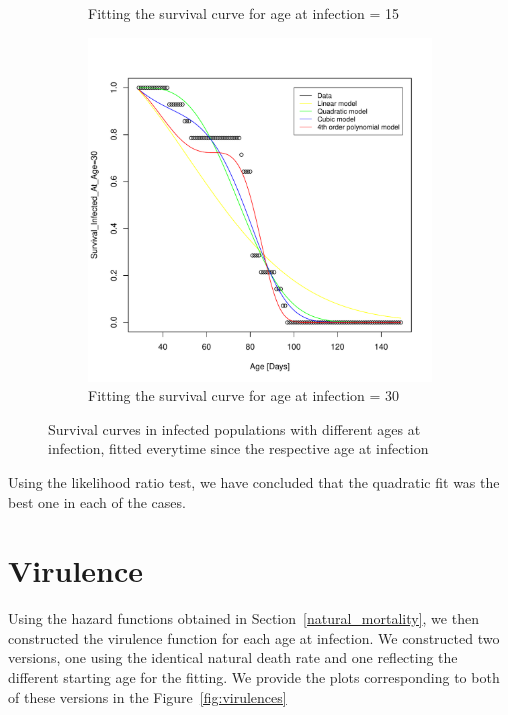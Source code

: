 \documentclass[10pt]{article}         %
\begin{document}
{\begin{figure}[H]
\begin{subfigure}[b]{0.5\textwidth}
    \caption{Fitting the survival curve for age at infection = 15}
    \label{fig:subfigure_2}
  \end{subfigure}
  \begin{subfigure}[b]{0.5\textwidth}
    \includegraphics[width=\textwidth]{Fitting_delta_inf_at_age_30.pdf}
    \caption{Fitting the survival curve for age at infection = 30}
    \label{fig:subfigure_3}
  \end{subfigure}
  \caption{Survival curves in infected populations with different ages at infection, fitted everytime since the respective age at infection}
  \label{fig:survival_infected}
\end{figure}}

Using the likelihood ratio test, we have concluded that the quadratic fit was the best one in each of the cases.

\section{Virulence}

Using the hazard functions obtained in Section~\ref{natural_mortality}, we then constructed the virulence function for each age at infection. We constructed two versions, one using the identical natural death rate and one reflecting the different starting age for the fitting. We provide the plots corresponding to both of these versions in the Figure~\ref{fig:virulences}
\end{document}
